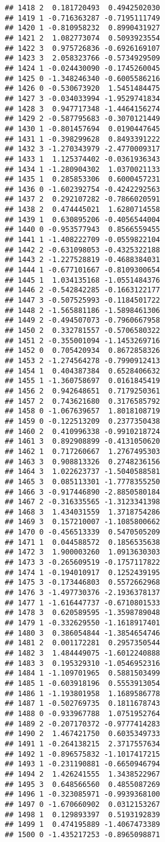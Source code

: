 \documentclass[
]{article}
\begin{document}
\begin{verbatim}
## 1418 2  0.181720493  0.4942502030
## 1419 1 -0.716363287 -0.7195111749
## 1420 1 -0.810958232  0.8990431927
## 1421 2  1.082773074  0.5093923554
## 1422 3  0.975726836 -0.6926169107
## 1423 3  2.058323766 -0.5734929509
## 1424 1 -0.024430090 -0.1745260045
## 1425 0 -1.348246340 -0.6005586216
## 1426 0 -0.530673920  1.5451484475
## 1427 3 -0.034033994 -1.9529741834
## 1428 3  0.947717348 -1.4464156274
## 1429 2 -0.587795683 -0.3070121449
## 1430 1 -0.801457694  0.0190447645
## 1431 1 -0.398299628  0.8493391222
## 1432 3 -1.270343979 -2.4770009317
## 1433 1  1.125374402 -0.0361936343
## 1434 1 -1.280904302  1.0370021133
## 1435 1  0.285853306  0.6000457231
## 1436 0 -1.602392754 -0.4242292563
## 1437 2  0.292107282 -0.7866020591
## 1438 2  0.474445021  1.6280714558
## 1439 1  0.630895206 -0.4056544004
## 1440 0 -0.953577943  0.8566559455
## 1441 1 -1.408222709 -0.0559822104
## 1442 2 -0.631098053 -0.4325322188
## 1443 2 -1.227528819 -0.4688384031
## 1444 1 -0.677101667 -0.8109300654
## 1445 1  1.034135168 -1.0551484376
## 1446 2 -0.542842285 -0.1663122177
## 1447 3 -0.507525993 -0.1184501722
## 1448 2 -1.565881186 -1.5898461306
## 1449 2 -0.494507073 -0.7960667958
## 1450 2  0.332781557 -0.5706580322
## 1451 2 -0.355001094 -1.1453269716
## 1452 0  0.705420934  0.8672858326
## 1453 2 -1.274564278 -0.7990912413
## 1454 1  0.404387384  0.6528406632
## 1455 1 -1.360758697  0.0161845419
## 1456 2  0.942648651  0.7179250361
## 1457 2  0.743621680  0.3176585792
## 1458 0 -1.067639657  1.8018108719
## 1459 0 -0.122513209  0.2377350438
## 1460 2  0.410996338 -0.9910218724
## 1461 3  0.892908899 -0.4131050620
## 1462 1  0.717260667  1.2767495303
## 1463 3  0.908813326  0.2748236156
## 1464 3  1.022623737 -1.5040588581
## 1465 3  0.085113301 -1.7778355250
## 1466 3 -0.917446890 -2.8850580184
## 1467 2 -0.316335565 -1.3123341398
## 1468 3  1.434031559  1.3718754286
## 1469 3  0.157210007 -1.1085800662
## 1470 0 -0.456513339  0.5470505209
## 1471 1  0.044588572  0.1856535638
## 1472 3  1.900003260  1.0913630303
## 1473 3 -0.265609519 -0.1757117822
## 1474 1 -0.194010917  0.1252439195
## 1475 3 -0.173446803  0.5572662968
## 1476 3 -1.497730376 -2.1936378137
## 1477 1 -1.616447737 -0.6710801533
## 1478 3  0.620589595 -1.3598789048
## 1479 1 -0.332629550 -1.1618917401
## 1480 3  0.386054844 -1.3854654746
## 1481 2  0.001172281  0.2957350544
## 1482 3  1.484449075 -1.6012240888
## 1483 3  0.195329310 -1.0546952316
## 1484 1 -1.109701965  0.5881503499
## 1485 1 -0.603918196  0.5553913054
## 1486 1 -1.193801958  1.1689586778
## 1487 1 -0.502769735  0.1811678743
## 1488 0 -0.933967788  1.0751952764
## 1489 2 -0.207170372 -0.9777414283
## 1490 2  1.467421750  0.6035349733
## 1491 1 -0.264138215  2.3717557634
## 1492 1 -0.896575832 -1.1017417215
## 1493 1 -0.231190881 -0.6650946794
## 1494 2  1.426241555  1.3438522967
## 1495 3  0.648566560  0.4855087269
## 1496 1 -0.323085971 -0.9939368100
## 1497 0 -1.670660902  0.0312153267
## 1498 1  0.129893397  0.5193192839
## 1499 1  0.474195889 -1.4067473389
## 1500 0 -1.435217253 -0.8965098871
\end{verbatim}
\end{document}

